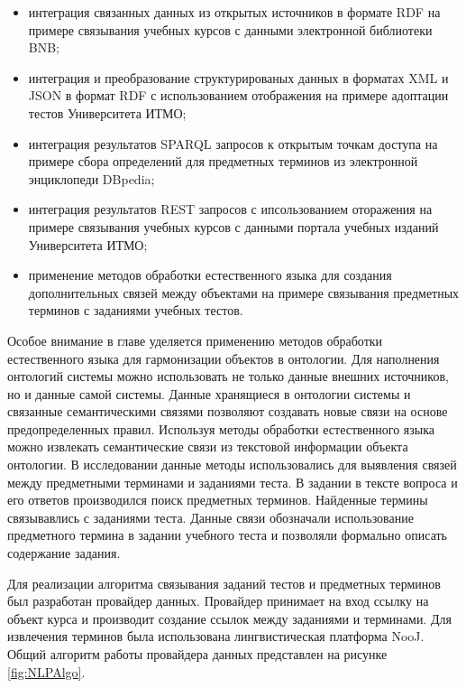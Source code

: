 \begin{itemize}
\item интеграция связанных данных из открытых источников в формате RDF на примере связывания учебных курсов с данными электронной библиотеки BNB;
\item интеграция и преобразование структурированых данных в форматах XML и JSON в формат RDF с использованием отображения на примере адоптации тестов Университета ИТМО;
\item интеграция результатов SPARQL запросов к открытым точкам доступа на примере сбора определений для предметных терминов из электронной энциклопеди DBpedia;
\item интеграция результатов REST запросов с ипсользованием оторажения на примере связывания учебных курсов с данными портала учебных изданий Университета ИТМО;
\item применение методов обработки естественного языка для создания дополнительных связей между объектами на примере связывания предметных терминов с заданиями учебных тестов.
\end{itemize}

Особое внимание в главе уделяется применению методов обработки естественного языка для гармонизации объектов в онтологии. Для наполнения онтологий системы можно использовать не только данные внешних источников, но и данные самой системы. Данные хранящиеся в онтологии системы и связанные семантическими связями позволяют создавать новые связи на основе предопределенных правил. Используя методы обработки естественного языка можно извлекать семантические связи из текстовой информации объекта онтологии. В исследовании данные методы использовались для выявления связей между предметными терминами и заданиями теста. В задании в тексте вопроса и его ответов производился поиск предметных терминов. Найденные термины связывавлись с заданиями теста. Данные связи обозначали использование предметного термина в задании учебного теста и позволяли формально описать содержание задания. 

Для реализации алгоритма связывания заданий тестов и предметных терминов был разработан провайдер данных. Провайдер принимает на вход ссылку на объект курса и производит создание ссылок между заданиями и терминами. Для извлечения терминов была использована лингвистическая платформа NooJ. Общий алгоритм работы провайдера данных представлен на рисунке \ref{fig:NLPAlgo}.

